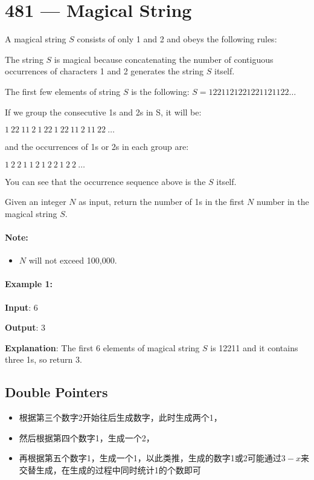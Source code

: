 \section{481 --- Magical String}
A magical string $S$ consists of only 1 and 2 and obeys the following rules:

The string $S$ is magical because concatenating the number of contiguous occurrences of characters 1 and 2 generates the string $S$ itself.

The first few elements of string $ S $ is the following: $S = 1221121221221121122\ldots$

If we group the consecutive 1s and 2s in S, it will be:

$1\  22\  11\  2\  1\  22\  1\  22\  11\  2\  11\  22\ \ldots $

and the occurrences of 1s or 2s in each group are:

$1\  2\ 	2 \ 1\  1\  2\  1\  2\  2\  1\  2\  2\ \ldots$

You can see that the occurrence sequence above is the $S$ itself.

Given an integer $N$ as input, return the number of 1s in the first $N$ number in the magical string $S$.

\paragraph{Note:} 
\begin{itemize}
\item $N$ will not exceed 100,000.
\end{itemize}

\paragraph{Example 1:}
\begin{flushleft}
\textbf{Input}: 6

\textbf{Output}: 3

\textbf{Explanation}: The first 6 elements of magical string $S$ is 12211 and it contains three 1s, so return 3.
\end{flushleft}

\subsection{Double Pointers}
\begin{itemize}
\item 根据第三个数字2开始往后生成数字，此时生成两个1，
\item 然后根据第四个数字1，生成一个2，
\item 再根据第五个数字1，生成一个1，以此类推，生成的数字1或2可能通过$3 - x$来交替生成，在生成的过程中同时统计1的个数即可
\end{itemize}

